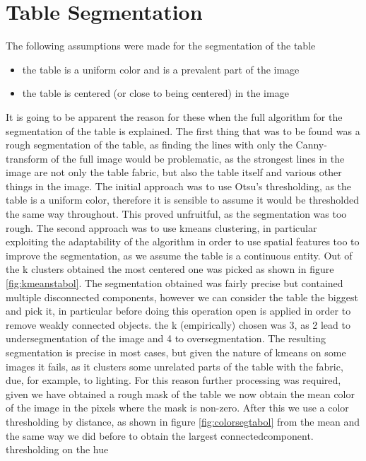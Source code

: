 \section{Table Segmentation}

The following assumptions were made for the segmentation of the table
\begin{itemize}
    \item the table is a uniform color and is a prevalent part of the image
    \item the table is centered (or close to being centered) in the image
\end{itemize}

It is going to be apparent the reason for these when the full algorithm for
the segmentation of the table is explained.
The first thing that was to be found was a rough segmentation of the table,
as finding the lines with only the Canny-transform of the full image would 
be problematic, as the strongest lines in the image are not only the table
fabric, but also the table itself and various other things in the image.
The initial approach was to use Otsu's thresholding, as the table is a uniform
color, therefore it is sensible to assume it would be thresholded the same
way throughout. This proved unfruitful, as the segmentation was too rough.
The second approach was to use kmeans clustering, in particular exploiting the
adaptability of the algorithm in order to use spatial features too to improve
the segmentation, as we assume the table is a continuous entity. Out of the k clusters obtained the most centered one was picked as shown in figure \ref{fig:kmeanstabol}.
The segmentation obtained was fairly precise but contained multiple disconnected
components, however we can consider the table the biggest and pick it, in particular
before doing this operation open is applied in order to remove weakly connected objects.
the k (empirically) chosen was 3, as 2 lead to undersegmentation of the image and 4 to oversegmentation.
The resulting segmentation is precise in most cases, but given the nature of kmeans on some
images it fails, as it clusters some unrelated parts of the table with the fabric, due,
for example, to lighting.
For this reason further processing was required, given we have obtained a rough mask of
the table we now obtain the mean color of the image in the pixels where the mask is non-zero.
After this we use a color thresholding by distance, as shown in figure \ref{fig:colorsegtabol} from the mean and the same way we 
did before to obtain the largest connectedcomponent. thresholding on the hue
